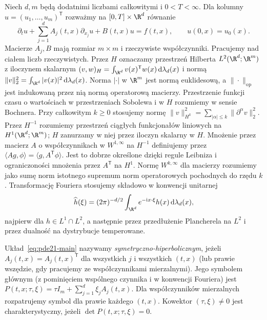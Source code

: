 Niech $d,m$ będą dodatnimi liczbami całkowitymi i $0<T<\infty$.
Dla kolumny $u=(u_1,\ldots,u_m)^\mathsf T$
rozważmy na $[0,T]\times\R^d$ równanie
\begin{equation}\label{eq:pde21-main}
 \partial_tu+\sum_{j=1}^d A_j(t,x)\partial_{x_j}u+B(t,x)u=f(t,x),
 \qquad u(0,x)=u_0(x).
\end{equation}
Macierze $A_j,B$ mają rozmiar $m\times m$ i rzeczywiste współczynniki.
Pracujemy nad ciałem liczb rzeczywistych. Przez $H$
oznaczamy przestrzeń Hilberta $L^2(\R^d;\R^m)$
z iloczynem skalarnym
$(v,w)_H=\int_{\R^d}v(x)^\mathsf Tw(x)\,\mathrm d\lambda_d(x)$
i normą $\|v\|_2^2=\int_{\R^d}|v(x)|^2\,\mathrm d\lambda_d(x)$.
Norma $|\cdot|$ w $\R^m$ jest normą euklidesową,
a $\|\cdot\|_{\mathrm{op}}$ jest indukowaną przez nią
normą operatorową macierzy. Przestrzenie funkcji czasu
o wartościach w przestrzeniach Sobolewa i w $H$
rozumiemy w sensie Bochnera.
Przy całkowitym $k\ge0$ stosujemy normę
$\|v\|_{H^k}^2=\sum_{|\alpha|\le k}\|\partial^\alpha v\|_2^2$.
Przez $H^{-1}$ rozumiemy przestrzeń ciągłych
funkcjonałów liniowych na $H^1(\R^d;\R^m)$;
$H$ zanurzamy w niej przez iloczyn skalarny w $H$.
Mnożenie przez macierz $A$ o współczynnikach
w $W^{1,\infty}$ na $H^{-1}$ definiujemy przez
$\langle Ag,\phi\rangle=\langle g,A^\mathsf T\phi\rangle$.
Jest to dobrze określone dzięki regule Leibniza
i ograniczoności mnożenia przez $A^\mathsf T$ na $H^1$.
Normę $W^{k,\infty}$ dla macierzy rozumiemy jako
sumę norm istotnego supremum norm operatorowych
pochodnych do rzędu $k$. Transformację Fouriera
stosujemy składowo w konwencji unitarnej
\[
 \widehat h(\xi)=(2\pi)^{-d/2}
 \int_{\R^d}e^{-\mathrm i x\cdot\xi}h(x)\,\mathrm d\lambda_d(x),
\]
najpierw dla $h\in L^1\cap L^2$, a następnie
przez przedłużenie Plancherela na $L^2$ i przez
dualność na dystrybucje temperowane.

\begin{definicja}\label{def:pde21-sym}
Układ~\eqref{eq:pde21-main} nazywamy \emph{symetryczno-hiperbolicznym},
jeżeli $A_j(t,x)=A_j(t,x)^\mathsf T$ dla wszystkich $j$ i wszystkich
$(t,x)$ (lub prawie wszędzie, gdy pracujemy ze współczynnikami mierzalnymi).
Jego symbolem głównym (z pominięciem wspólnego
czynnika $\mathrm i$ w konwencji Fouriera) jest
$P(t,x;\tau,\xi)=\tau I_m+\sum_{j=1}^d\xi_jA_j(t,x)$.
Dla współczynników mierzalnych rozpatrujemy symbol
dla prawie każdego $(t,x)$.
Kowektor $(\tau,\xi)\ne0$ jest charakterystyczny, jeżeli
$\det P(t,x;\tau,\xi)=0$.
\end{definicja}

